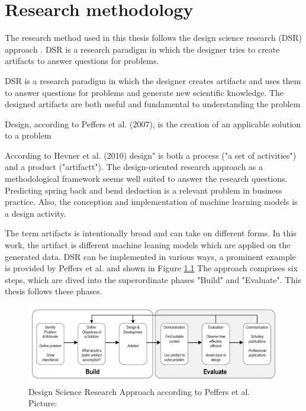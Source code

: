\chapter{Research methodology} 

The research method used in this thesis follows the design science research (DSR) approach 
\cite[p. 17]{rennenkampff_managementitagilitaetentwicklung_2015}. 
DSR is a research paradigm in which the designer tries to create artifacts to answer questions for problems.

DSR is a research paradigm in which the designer creates artifacts and uses them to answer questions for problems and generate new scientific knowledge. 
The designed artifacts are both useful and fundamental to understanding the problem \cite[p. 10]{hevner_designscienceresearch_2010}

Design, according to Peffers et al. (2007), is the creation of an applicable solution to a problem \cite[p.47]{peffers_designscienceresearch_2007}

According to Hevner et al. (2010)
design" is both a process ("a set of activities") and a product ("artifactt"). \cite[p.78]{hevner_designscienceresearch_2010}
The design-oriented research approach as a methodological framework seems well suited to answer the research questions.
Predicting spring back and bend deduction is a relevant problem in business practice. 
Also, the conception and implementation of machine learning models is a design activity. 

The term artifacts is intentionally broad and can take on different forms. In this work, the artifact is different machine leaning models which are applied on the generated data. 
DSR can be implemented in various ways, a prominent example is provided by Peffers et al. and shown in Figure \ref{fig:dsr_process}
The approach comprises six steps, which are dived into the superordinate phases "Build" and "Evaluate". This thesis follows these phases.

 \begin{figure}
	\centering
	\includegraphics[width=1.1\linewidth]{chap3/images/dsr_process.png}
	\caption[DSR Process]{Design Science Research Approach according to Peffers et al. Picture: \cite[p. 72]{sonnenberg_evaluationpatternsdesign_2012}}
	\label{fig:dsr_process}
\end{figure}

